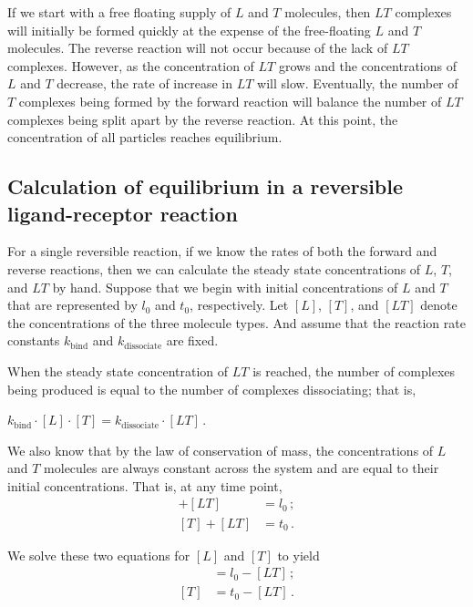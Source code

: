 If we start with a free floating supply of $L$ and $T$ molecules, then $LT$ complexes will initially be formed quickly at the expense of the free-floating $L$ and $T$ molecules. The reverse reaction will not occur because of the lack of $LT$ complexes. However, as the concentration of $LT$ grows and the concentrations of $L$ and $T$ decrease, the rate of increase in $LT$ will slow. Eventually, the number of $T$ complexes being formed by the forward reaction will balance the number of $LT$ complexes being split apart by the reverse reaction. At this point, the concentration of all particles reaches equilibrium.

\FloatBarrier
{}
\subsection{Calculation of equilibrium in a reversible ligand-receptor reaction}

For a single reversible reaction, if we know the rates of both the forward and reverse reactions, then we can calculate the steady state concentrations of $L$, $T$, and $LT$ by hand.  Suppose that we begin with initial concentrations of $L$ and $T$ that are represented by $l_0$ and $t_0$, respectively. Let $[L]$, $[T]$, and $[LT]$ denote the concentrations of the three molecule types. And assume that the reaction rate constants $k_\text{bind}$ and $k_\text{dissociate}$ are fixed.

When the steady state concentration of $LT$ is reached, the number of complexes being produced is equal to the number of complexes dissociating; that is,

\begin{center}
$k_\text{bind} \cdot [L] \cdot [T] = k_\text{dissociate} \cdot [LT] $\,.

\end{center}

We also know that by the law of conservation of mass, the concentrations of $L$ and $T$ molecules are always constant across the system and are equal to their initial concentrations. That is, at any time point,
\begin{align*}
[L] + [LT] & = l_0\,;\\
[T] + [LT] & = t_0\,.
\end{align*}

\noindent We solve these two equations for $[L]$ and $[T]$ to yield
\begin{align*}
[L] & = l_0 - [LT]\,;\\
[T] & = t_0 - [LT]\,.
\end{align*}


